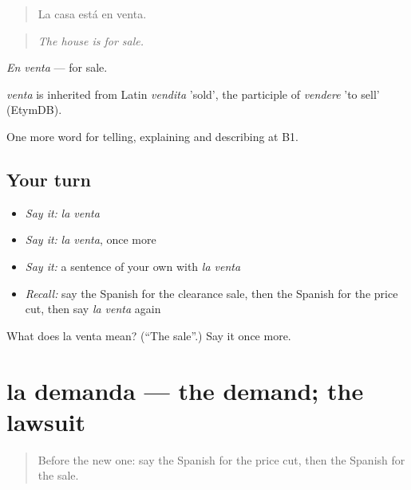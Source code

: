 \begin{quote}
La casa está en venta.
\end{quote}

\begin{quote}
\emph{The house is for sale.}
\end{quote}

\emph{En venta} — for sale.

\begin{cousinweb}
\emph{venta} is inherited from Latin \emph{vendita} 'sold', the participle of \emph{vendere} 'to sell' (EtymDB).
\end{cousinweb}

\begin{grammarlens}[title={What you've built}]
One more word for telling, explaining and describing at B1.
\end{grammarlens}

\subsection*{Your turn}
\begin{itemize}
\raggedright
  \item \emph{Say it:} \emph{la venta}
  \item \emph{Say it:} \emph{la venta}, once more
  \item \emph{Say it:} a sentence of your own with \emph{la venta}
  \item \emph{Recall:} say the Spanish for the clearance sale, then the Spanish for the price cut, then say \emph{la venta} again
\end{itemize}

\begin{tcolorbox}[breakable,colback=teal!4,colframe=teal!35!black,title={Before you move on}]
What does la venta mean? (\textquotedblleft{}The sale\textquotedblright{}.) Say it once more.
\end{tcolorbox}
\section[la demanda]{la demanda — the demand; the lawsuit}

\label{lesson:ES-C631-demanda}



\begin{quote}
Before the new one: say the Spanish for the price cut, then the Spanish for the sale.
\end{quote}

